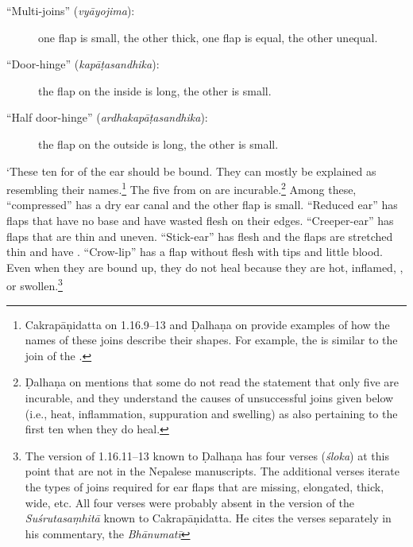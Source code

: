 \begin{translation}
\begin{description}
\item[\mdseries``Multi-joins'' (\emph{vyāyojima}):]
        one flap is small, the other thick, one flap is equal, the other unequal.
        
\item[\mdseries``Door-hinge'' (\emph{kapāṭasandhika}):]
        the flap on the inside is long, the other is small.
        
\item[\mdseries``Half door-hinge'' (\emph{ardhakapāṭasandhika}):]
        the flap on the outside is long, the other is small.
    \end{description}

`These ten  for  of the ear should be
bound.  They can mostly be explained as resembling their
names.\footnote{Cakrapāṇidatta on 1.16.9–13 \citep[128–129]{acar-1939} and Ḍalhaṇa
    on  provide examples of how the names of these joins describe
    their shapes. For example, the  is similar to the
    join of the .}  The five from
     on are incurable.\footnote{Ḍalhaṇa on
         mentions that some do not read the statement that only five
        are incurable, and they understand the causes of unsuccessful joins given below
        (i.e., heat, inflammation, suppuration and swelling) as also pertaining to the
        first ten when they do heal.}  Among these, “compressed” has a dry ear canal and
        the other flap is small.   “Reduced ear” has flaps that have no base and have
        wasted flesh on their edges. “Creeper-ear” has flaps that are thin and uneven.
        “Stick-ear” has  flesh and the flaps are stretched thin and
        have  .  “Crow-lip” has a flap without flesh
        with  tips and little blood. Even when they are bound
        up, they do not heal because they are hot, inflamed, , or
        swollen.\footnote{The version of 1.16.11–13 known to Ḍalhaṇa \citep[78]{vulgate}
            has four verses (\emph{śloka}) at this point that are not in the Nepalese
            manuscripts. The additional verses iterate the types of joins required for ear
            flaps that are missing, elongated, thick, wide, etc. All four verses were probably
            absent in the version of the \emph{Suśrutasaṃhitā} known to Cakrapāṇidatta. He
            cites the verses separately in his commentary, the \emph{Bhānumatī}
}
\end{translation}
